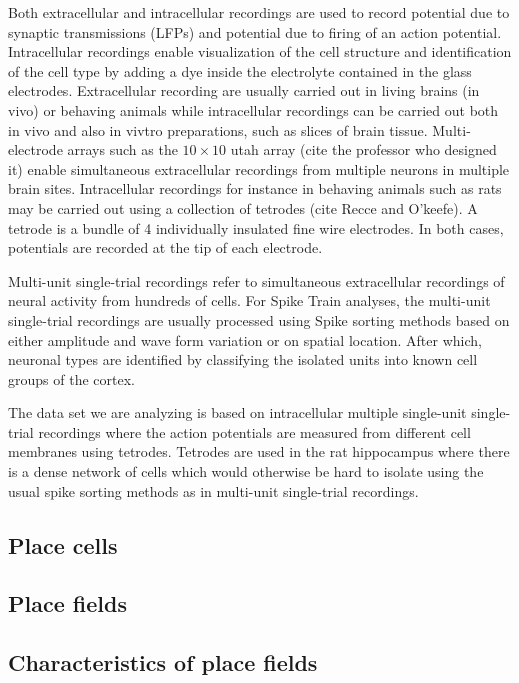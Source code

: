 Both extracellular and intracellular recordings are used to record potential due to synaptic transmissions (LFPs) and potential due to firing of an action potential.
Intracellular recordings enable visualization of the cell structure and identification
of the cell type by adding a dye inside the electrolyte contained in the glass electrodes.
Extracellular recording are usually carried out in living brains (in vivo) or behaving animals
while intracellular recordings can be carried out both in vivo and also in vivtro preparations, such as slices of brain tissue. Multi-electrode arrays such as the $10 \times 10$ utah array (cite the professor who designed it)  enable simultaneous extracellular recordings from  multiple neurons in multiple brain sites. 
Intracellular recordings for instance in behaving animals such as rats may be carried out using 
a collection of tetrodes (cite Recce and O'keefe).
A tetrode is a bundle of 4 individually insulated fine wire electrodes. In both cases, potentials are recorded at the tip of each electrode. 



Multi-unit single-trial recordings refer to simultaneous  extracellular recordings of neural activity from hundreds of cells.
For Spike Train analyses, the multi-unit single-trial recordings are usually processed using  Spike sorting methods  based on  either amplitude and wave form variation or on spatial location. After which, neuronal types are identified by classifying the isolated units into known cell groups of the cortex.

The data set we are analyzing is based on intracellular multiple single-unit single-trial recordings where the action potentials are measured from different cell membranes using tetrodes. Tetrodes are used in the rat hippocampus where there is a dense network of cells which would otherwise be hard to isolate using the usual spike sorting methods as in multi-unit single-trial recordings.


\subsection{Place cells}


\subsection{Place fields}


\subsection{Characteristics of place fields}





